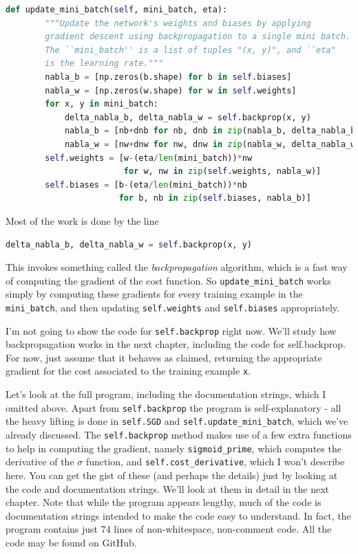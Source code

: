\begin{lstlisting}[language=Python]
    def update_mini_batch(self, mini_batch, eta):
        """Update the network's weights and biases by applying
        gradient descent using backpropagation to a single mini batch.
        The ``mini_batch'' is a list of tuples "(x, y)", and ``eta"
        is the learning rate."""
        nabla_b = [np.zeros(b.shape) for b in self.biases]
        nabla_w = [np.zeros(w.shape) for w in self.weights]
        for x, y in mini_batch:
            delta_nabla_b, delta_nabla_w = self.backprop(x, y)
            nabla_b = [nb+dnb for nb, dnb in zip(nabla_b, delta_nabla_b)]
            nabla_w = [nw+dnw for nw, dnw in zip(nabla_w, delta_nabla_w)]
        self.weights = [w-(eta/len(mini_batch))*nw 
                        for w, nw in zip(self.weights, nabla_w)]
        self.biases = [b-(eta/len(mini_batch))*nb 
                       for b, nb in zip(self.biases, nabla_b)]
\end{lstlisting}
                       
Most of the work is done by the line 

\begin{lstlisting}[language=Python]
            delta_nabla_b, delta_nabla_w = self.backprop(x, y)
\end{lstlisting}

This invokes something called the \textit{backpropagation} algorithm, which is a fast way of computing the gradient of the cost function. So \lstinline{update_mini_batch} works simply by computing these gradients for every training example in the \lstinline{mini_batch}, and then updating \lstinline{self.weights} and \lstinline{self.biases} appropriately.

I'm not going to show the code for \lstinline{self.backprop} right now. We'll study how backpropagation works in the next chapter, including the code for self.backprop. For now, just assume that it behaves as claimed, returning the appropriate gradient for the cost associated to the training example \lstinline{x}.

Let's look at the full program, including the documentation strings, which I omitted above. Apart from \lstinline{self.backprop} the program is self-explanatory - all the heavy lifting is done in \lstinline{self.SGD} and \lstinline{self.update_mini_batch}, which we've already discussed. The \lstinline{self.backprop} method makes use of a few extra functions to help in computing the gradient, namely \lstinline{sigmoid_prime}, which computes the derivative of the $\sigma$ function, and \lstinline{self.cost_derivative}, which I won't describe here. You can get the gist of these (and perhaps the details) just by looking at the code and documentation strings. We'll look at them in detail in the next chapter. Note that while the program appears lengthy, much of the code is documentation strings intended to make the code easy to understand. In fact, the program contains just 74 lines of non-whitespace, non-comment code. All the code may be found on GitHub.


